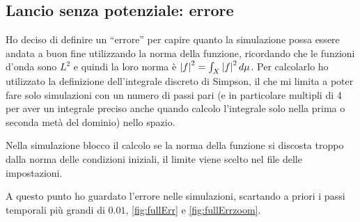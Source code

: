 \subsection{Lancio senza potenziale: errore}\label{sec:errore}
Ho deciso di definire un ``errore'' per capire quanto la simulazione possa essere andata a buon fine utilizzando la norma della funzione, ricordando che le funzioni d'onda sono $L^2$ e quindi la loro norma \`e  $\lr||f^2=\int_X\lr||f^2d\mu$.
Per calcolarlo ho utilizzato la definizione dell'integrale discreto di Simpson, il che mi limita a poter fare solo simulazioni con un numero di passi pari (e in particolare multipli di 4 per aver un integrale preciso anche quando calcolo l'integrale solo nella prima o seconda met\`a del dominio) nello spazio.

Nella simulazione blocco il calcolo se la norma della funzione si discosta troppo dalla norma delle condizioni iniziali, il limite viene scelto nel file delle impostazioni.

A questo punto ho  guardato l'errore nelle simulazioni, scartando a priori i passi temporali pi\`u grandi di $0.01$, \autoref{fig:fullErr} e \ref{fig:fullErrzoom}.

